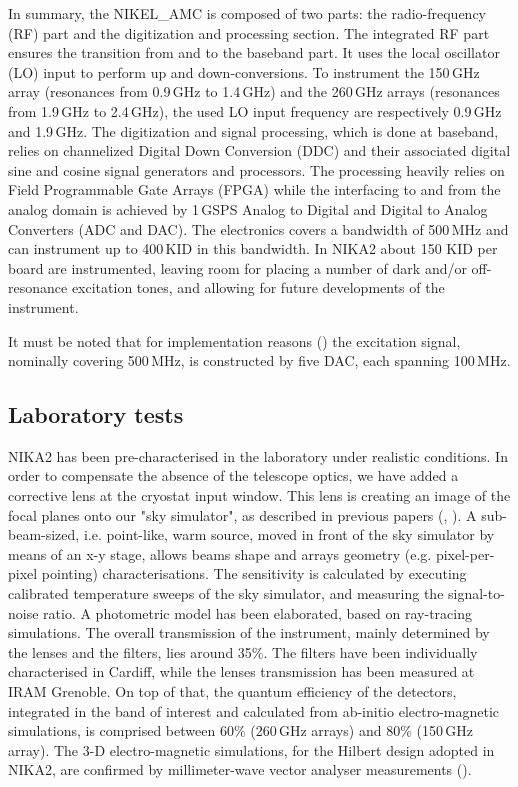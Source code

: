 \documentclass[]{aa} %
\begin{document}
In summary, the NIKEL\_AMC is composed of two parts: the radio-frequency (RF) part and the digitization and processing section.
The integrated RF part ensures the transition from and to the baseband part.
It uses the local oscillator (LO) input to perform up and down-conversions.
To instrument the 150\,GHz array (resonances from 0.9\,GHz to 1.4\,GHz) and the 260\,GHz arrays (resonances from 1.9\,GHz to 2.4\,GHz), the used LO input frequency are respectively 0.9\,GHz and 1.9\,GHz. The digitization and signal processing, which is done at baseband, relies on channelized Digital Down Conversion (DDC) and their associated digital sine and cosine signal generators and processors.
The processing heavily relies on Field Programmable Gate Arrays (FPGA) while the interfacing to and from the analog domain is achieved by 1\,GSPS Analog to Digital and Digital to Analog Converters (ADC and DAC).
The electronics covers a bandwidth of 500\,MHz and can instrument up to 400\,KID in this bandwidth. In NIKA2 about 150 KID per board are instrumented, leaving room for placing a number of dark and/or off-resonance excitation tones, and allowing for future developments of the instrument. 

It must be noted that for implementation reasons (\cite{Bourrion2012,Bourrion2016}) the excitation signal, nominally covering 500\,MHz, is constructed by five DAC, each spanning 100\,MHz.



\subsection{Laboratory tests}
\label{Laboratory tests}

NIKA2 has been pre-characterised in the laboratory under realistic conditions. In order to compensate the absence of the telescope optics, we have added a corrective lens at the cryostat input window. This lens is creating an image of the focal planes onto our "sky simulator", as described in previous papers (\cite{Catalano2014}, \cite{Monfardini2011}). A sub-beam-sized, i.e. point-like, warm source, moved in front of the sky simulator by means of an x-y stage, allows beams shape and arrays geometry (e.g. pixel-per-pixel pointing) characterisations. The sensitivity is calculated by executing calibrated temperature sweeps of the sky simulator, and measuring the signal-to-noise ratio. A photometric model has been elaborated, based on ray-tracing simulations. The overall transmission of the instrument, mainly determined by the lenses and the filters, lies around 35\%. The filters have been individually characterised in Cardiff, while the lenses transmission has been measured at IRAM Grenoble. On top of that, the quantum efficiency of the detectors, integrated in the band of interest and calculated from ab-initio electro-magnetic simulations, is comprised between 60\% (260\,GHz arrays) and 80\% (150\,GHz array). The 3-D electro-magnetic simulations, for the Hilbert design adopted in NIKA2, are confirmed by millimeter-wave vector analyser measurements (\cite{Roesch2012}).
\end{document}
